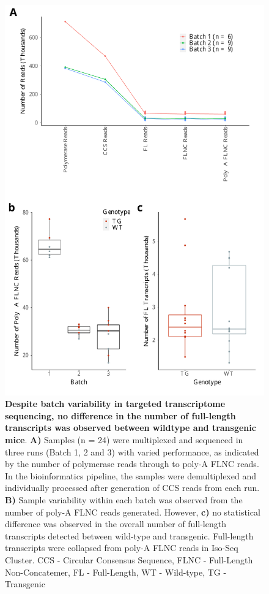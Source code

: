 \begin{figure}[!htp]
	\begin{center}
		\includegraphics[page=1,trim={0 1cm 0 0},clip,scale = 0.55]{Figures/TargetedTranscriptome.pdf}
	\end{center}
	\captionsetup{width=0.95\textwidth}
	\caption[Targeted Transcriptome Iso-seq run performance]%
	{\textbf{Despite batch variability in targeted transcriptome sequencing, no difference in the number of full-length transcripts was observed between wildtype and transgenic mice}. \textbf{A)} Samples (n = 24) were multiplexed and sequenced in three runs (Batch 1, 2 and 3) with varied performance, as indicated by the number of polymerase reads through to poly-A FLNC reads. In the bioinformatics pipeline, the samples were demultiplexed and individually processed after generation of CCS reads from each run. \textbf{B)} Sample variability within each batch was observed from the number of poly-A FLNC reads generated. However, \textbf{c)} no statistical difference was observed in the overall number of full-length transcripts detected between wild-type and transgenic. Full-length transcripts were collapsed from poly-A FLNC reads in Iso-Seq Cluster. CCS - Circular Consensus Sequence, FLNC - Full-Length Non-Concatemer, FL - Full-Length, WT - Wild-type, TG - Transgenic}
	\label{fig:isoseq_targeted_run_output}
\end{figure}

